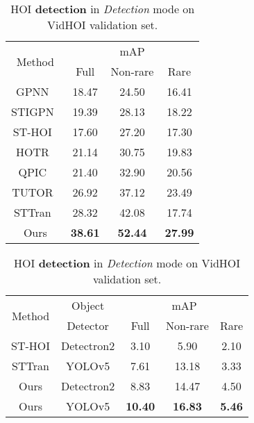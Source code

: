 \documentclass[times,twocolumn,final,authoryear]{elsarticle}
\begin{document}
\begin{table}
    \centering
    \begin{subtable}[b]{0.48\textwidth}
        \centering
        \small
        \begin{tabular}{|c|c c c|}
            \hline
            \multirow{2}{*}{Method} & \multicolumn{3}{c|}{mAP}\\
            \cline{2-4}
            & Full & Non-rare & Rare\\
            \hhline{|=|= = =|}
            GPNN~\citep{hoi_v2:learning_gpn} & 18.47 & 24.50 & 16.41\\
            STIGPN~\citep{hoi_v2:st_gpn} & 19.39 & 28.13 & 18.22\\
            ST-HOI~\citep{hoi_v_set:VidHOI} & 17.60 & 27.20 & 17.30\\
            \hline
            HOTR~\citep{hoi_i1:hotr} & 21.14 & 30.75 & 19.83\\
            QPIC~\citep{hoi_i1:qpic} & 21.40 & 32.90 & 20.56\\
            TUTOR~\citep{hoi_v2:tubelet_tokens} & 26.92 & 37.12 & 23.49\\
            \hline
            STTran~\citep{hoi_v2:sttran} & 28.32 & 42.08 & 17.74\\
            Ours & \textbf{38.61} & \textbf{52.44} & \textbf{27.99}\\
            \hline
        \end{tabular}
        \caption{HOI \textbf{detection} in \textit{Oracle} mode on VidHOI validation set.}
        \label{table:detection_oracle}
    \end{subtable}

    \begin{subtable}[b]{0.48\textwidth}
        \centering
        \small
        \begin{tabular}{|c|c|c c c|}
            \hline
            \multirow{2}{*}{Method} & Object & \multicolumn{3}{c|}{mAP}\\
            \cline{3-5}
            & Detector & Full & Non-rare & Rare\\
            \hhline{|=|=|= = =|}
            ST-HOI & Detectron2 & 3.10 & 5.90 & 2.10\\
            STTran & YOLOv5 & 7.61 & 13.18 & 3.33\\
            Ours & Detectron2 & 8.83 & 14.47 & 4.50\\
            Ours & YOLOv5 & \textbf{10.40} & \textbf{16.83} & \textbf{5.46}\\
            \hline
        \end{tabular}
        \caption{HOI \textbf{detection} in \textit{Detection} mode on VidHOI validation set.}
        \label{table:detection_detection}
    \end{subtable}


\end{table}
\end{document}
